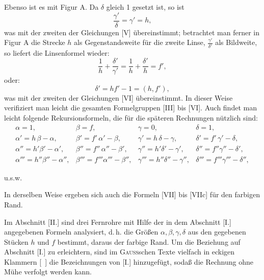 Ebenso ist es mit Figur A. Da $\delta$ gleich 1 gesetzt ist, so ist
\[
\frac{\gamma'}\delta=\gamma'=h,
\]
\noindent was mit der zweiten der Gleichungen [V] übereinstimmt; betrachtet man ferner in Figur A die Strecke $h$ als Gegenstandsweite für die zweite Linse, $\frac{\gamma'}{\delta'}$ als Bildweite, so liefert die Linsenformel wieder:
\[
\frac1h+\frac{\delta'}{\gamma'}=\frac1h+\frac{\delta'}h=f',
\]
\noindent oder:
\[
\delta'=hf'-1=(h,f'),
\]
\noindent was mit der zweiten der Gleichungen [VI] übereinstimmt. In dieser Weise verifiziert man leicht die gesamten Formelgruppen [III] bis [VI]. Auch findet man leicht folgende Rekursionsformeln, die für die späteren Rechnungen nützlich sind:
\[
\begin{array}{llll}
\alpha=1,&\beta=f,&\gamma=0,&\delta=1,\\
\alpha'=h\,\beta-\alpha,&\beta'=f'\,\alpha'-\beta,&\gamma'=h\,\delta-\gamma,&\delta'=f'\,\gamma'-\delta,\\
\alpha''=h'\beta'-\alpha',&\beta''=f''\,\alpha''-\beta',&\gamma''=h'\delta'-\gamma',&\delta''=f''\gamma''-\delta',\\
\alpha'''=h''\beta''-\alpha'',&\beta'''=f'''\alpha'''-\beta'',&\gamma'''=h''\delta''-\gamma'',&\delta'''=f'''\gamma'''-\delta'',
\end{array}
\]
\begin{center}u.s.w.\end{center}
\noindent In derselben Weise ergeben sich auch die Formeln [VII] bis [VIIc] für den farbigen Rand.
\begin{center}\end{center}
\noindent\hspace*{\parindent}Im Abschnitt [II.] sind drei Fernrohre mit Hilfe der in dem Abschnitt [I.] angegebenen Formeln analysiert, d.\,h. die Größen $\alpha,\beta,\gamma,\delta$ aus den gegebenen Stücken $h$ und $f$ bestimmt, daraus der farbige Rand. Um die Beziehung auf Abschnitt [I.] zu erleichtern, sind im \textsc{Gauss}schen Texte vielfach in eckigen Klammern [\ ] die Bezeichnungen von [I.] hinzugefügt, sodaß die Rechnung ohne Mühe verfolgt werden kann.

